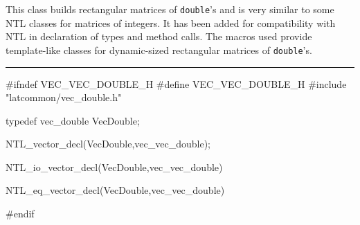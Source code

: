 % 
% 
% 
% 

  
This class builds rectangular matrices of \texttt{double}'s and is very similar
to some NTL classes for matrices of integers. It has been added for compatibility
with NTL in declaration of types and method calls. The macros used provide 
template-like classes for dynamic-sized rectangular matrices of \texttt{double}'s.


\bigskip\hrule
\code \hide
#ifndef VEC_VEC_DOUBLE_H
#define VEC_VEC_DOUBLE_H
\endhide
#include "latcommon/vec_double.h"


typedef vec_double VecDouble; 

NTL_vector_decl(VecDouble,vec_vec_double);

NTL_io_vector_decl(VecDouble,vec_vec_double)

NTL_eq_vector_decl(VecDouble,vec_vec_double)

\hide
#endif
\endhide
\endcode

